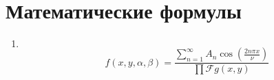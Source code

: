 \documentclass[11pt]{article}
\begin{document}
\center\section*{Математические формулы}
\begin{enumerate}
 по $t$ порядка $(n-1)$ в точке $t=\tau$ терпит скачок равный единице
\[
	\frac{\partial^{n-1}G(\tau+0,\tau)}{\partial t^{n-1}}-\frac{\partial^{n-1}G(\tau-0,\tau)}{\partial t^{n-1}}=1.
\]
-функция $g(t)$ имеет вид
\[
	g(t)=\int\limits_a^t (b(\tau)+\Phi^{-1}e_n)f(\tau)dt+\int\limits_t^b b(\tau)f(\tau)dt.
\]
 Грина имеет вид
\[
			G(t,\tau)=
			\begin{cases}
				\Phi(t)F\Phi^{-1}(\tau), & t\le\tau,\\
				\Phi(t)(I+F)\Phi^{-1}(\tau), & \tau<t,
			\end{cases}
\]
\\ где $F=-V^{-1}N\Phi(b)$.
 ряд
\[
	\sum\limits_{k=0}^{\infty}e^{-k(A+iB)}=
		\frac
			{e^A-\cos(B)+i\sin(B)}
			{2(\ch(A)-\cos(B))}
\]
 множественный коэффициент корреляции
\[
	\widehat R_{yx}^2=1-\frac{\det R}{\left| R\right|_{00}}=
		\begin{pmatrix}
			1 & \hat r_{yx_1} & \hat r_{yx_2} \\
			\hat r_{x_1y} & 1 & \hat r_{x_1x_2} \\
			\hat r_{x_2y} & \hat r_{x_2x_1} & 1
		\end{pmatrix}
\]
 корреляции Спирмена
\[
	r^c=1-\frac
		{6\sum\limits_{i=1}^{n}d_i^2}
		{n(n^2-1)}
\]
 $\chi^2$
\[
	C=\left[ 
		\frac
			{\chi_{ct}^2}
			{n\cdot \min(m_1-1,m_2-1)}
	    \right]^{\frac{1}{2}}
\]
\item
\[
	
\]
\[
		f(x,y,\alpha, \beta) =
		 	\frac
				{\sum \limits_{n=1}^{\infty}A_n \cos \left( \frac{2 n \pi x}{\nu} \right)}
			 	{\prod \mathcal{F} {g(x,y)} } 
\]
\end{enumerate}
\end{document}
